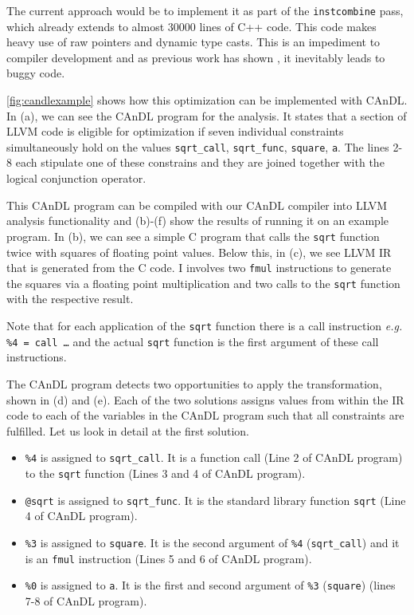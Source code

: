     The current approach would be to implement it as part of the
    \texttt{instcombine} pass, which already extends to almost 30000 lines of
    C++ code.
    This code makes heavy use of raw pointers and dynamic type casts.
    This is an impediment to compiler development and as previous work has shown
    \cite{Yang:2011:FUB:1993316.1993532,Menendez:2017:ADP:3062341.3062372}, it
    inevitably leads to buggy code.

    \autoref{fig:candlexample} shows how this optimization can be implemented
    with CAnDL.
    In (a), we can see the CAnDL program for the analysis. 
    It states that a section of LLVM code is eligible for optimization if seven
    individual constraints simultaneously hold on the values
    \texttt{sqrt\_call}, \texttt{sqrt\_func}, \texttt{square}, \texttt{a}.
    The lines 2-8 each stipulate one of these constrains and they are joined
    together with the logical conjunction operator. 

    This CAnDL program can be compiled with our CAnDL compiler into LLVM
    analysis functionality and (b)-(f) show the results of running it on an
    example program.
    In (b), we can see a simple C program that calls the \texttt{sqrt} function
    twice with squares of floating point values. 
    Below this, in (c), we see LLVM IR that is generated from the C code.
    I involves two \texttt{fmul} instructions to generate the squares via a
    floating point multiplication and two calls to the \texttt{sqrt} function
    with the respective result. 

    Note that for each application of the \texttt{sqrt} function there is a call
    instruction {\it e.g.} {\tt \%4 = call \dots} and the actual \texttt{sqrt}
    function is the first argument of these call instructions.

    The CAnDL program detects two opportunities to apply the transformation,
    shown in (d) and (e).
    Each of the two solutions assigns values from within the IR code to each of
    the variables in the CAnDL program such that all constraints are fulfilled.
    Let us look in detail at the first solution.
    \begin{itemize}
    \item \texttt{\%4} is assigned to \texttt{sqrt\_call}. It is a function call
          (Line 2 of CAnDL program) to the \texttt{sqrt} function (Lines 3 and 4
          of CAnDL program).
    \item \texttt{@sqrt} is assigned to \texttt{sqrt\_func}. It is the standard
          library function \texttt{sqrt} (Line 4 of CAnDL program). 
    \item \texttt{\%3} is assigned to \texttt{square}. It is the second argument
          of \texttt{\%4} (\texttt{sqrt\_call}) and it is an \texttt{fmul}
          instruction (Lines 5 and 6 of CAnDL program).
    \item \texttt{\%0} is assigned to \texttt{a}. It is the first and second
          argument of \texttt{\%3} (\texttt{square}) (lines 7-8 of CAnDL
          program).
    \end{itemize}

